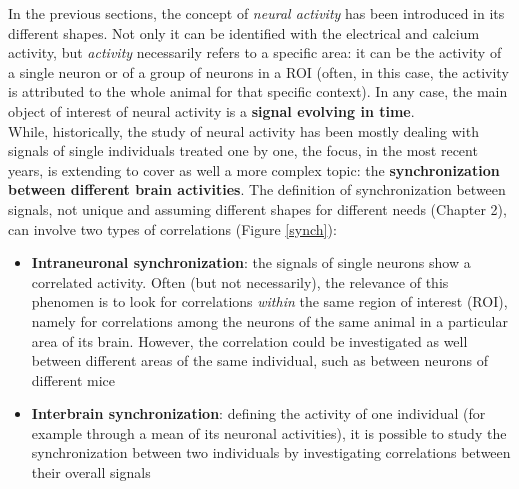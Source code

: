 \documentclass[12pt, a4paper]{report}
\begin{document}
In the previous sections, the concept of \textit{neural activity} has been introduced in its different shapes. Not only it can be identified with the electrical and calcium activity, but \textit{activity} necessarily refers to a specific area: it can be the activity of a single neuron or of a group of neurons in a ROI (often, in this case, the activity is attributed to the whole animal for that specific context). In any case, the main object of interest of neural activity is a \textbf{signal evolving in time}.\\
While, historically, the study of neural activity has been mostly dealing with signals of single individuals treated one by one, the focus, in the most recent years, is extending to cover as well a more complex topic: the \textbf{synchronization between different brain activities}. The definition of synchronization between signals, not unique and assuming different shapes for different needs (Chapter 2), can involve two types of correlations (Figure \ref{synch}):

\begin{itemize}
	
	\item \textbf{Intraneuronal synchronization}: the signals of  single neurons show a correlated activity. Often (but not necessarily), the relevance of this phenomen is to look for correlations \textit{within} the same region of interest (ROI), namely for correlations among the neurons of the same animal in a particular area of its brain. However, the correlation could be investigated as well between different areas of the same individual, such as between neurons of different mice
	
	\item \textbf{Interbrain synchronization}: defining the activity of one individual (for example through a mean of its neuronal activities), it is possible to study the synchronization between two individuals by investigating correlations between their overall signals
	
\end{itemize}
\end{document}
